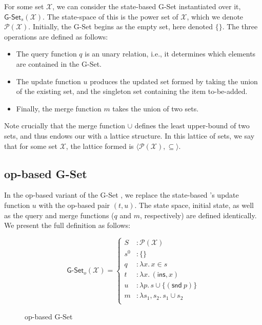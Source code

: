 For some set $\mathcal{X}$, we can consider the state-based G-Set \CRDT
instantiated over it, $\textsf{G-Set}_s(\mathcal{X})$. The state-space of this
\CRDT is the power set of $\mathcal{X}$, which we denote
$\mathcal{P}(\mathcal{X})$. Initially, the G-Set begins as the empty set, here
denoted $\{ \}$. The three operations are defined as follows:
\begin{itemize}
  \item The query function $q$ is an unary relation, i.e., it determines which
    elements are contained in the G-Set.
  \item The update function $u$ produces the updated set formed by taking the
    union of the existing set, and the singleton set containing the item
    to-be-added.
  \item Finally, the merge function $m$ takes the union of two sets.
\end{itemize}
Note crucially that the merge function $\cup$ defines the least upper-bound of
two sets, and thus endows our \CRDT with a lattice structure. In this lattice of
sets, we say that for some set $\mathcal{X}$, the lattice formed is $\langle
\mathcal{P}(\mathcal{X}), \subseteq \rangle$.

\subsection{op-based G-Set}
In the op-based variant of the G-Set \CRDT, we replace the state-based \CRDT's
update function $u$ with the op-based pair $(t,u)$. The state space, initial
state, as well as the query and merge functions ($q$ and $m$, respectively) are
defined identically. We present the full definition as follows:

\begin{figure}[H]
  \centering
  \[
    \textsf{G-Set}_o(\mathcal{X}) = \left\{\begin{aligned}
      S &: \mathcal{P}(\mathcal{X}) \\
      s^0 &: \{ \} \\
      q &: \lambda x.\, x \in s \\
      t &: \lambda x.\, (\textsf{ins}, x) \\
      u &: \lambda p.\, s \cup \{(\textsf{snd}~p)\} \\
      m &: \lambda s_1, s_2.\, s_1 \cup s_2 \\
    \end{aligned}\right.
  \]
  \caption{op-based \textsf{G-Set} \CRDT}
\end{figure}

